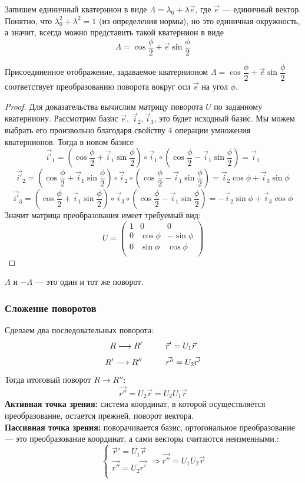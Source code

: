 Запишем единичный кватернион в виде $\Lambda = \lambda_0 + \lambda\vec{e}$, где $\vec{e}$ --- единичный вектор. Понятно, что $\lambda_0^2 + \lambda^2 = 1$ (из определения нормы), но это единичная окружность, а значит, всегда можно представить такой кватернион в виде
\[
\Lambda = \cos{\dfrac{\phi}{2}} + \vec{e}\sin{\dfrac{\phi}{2}}
\]
\begin{theorem}
    Присоединенное отображение, задаваемое кватернионом $\Lambda = \cos{\dfrac{\phi}{2}} + \vec{e}\sin{\dfrac{\phi}{2}}$ соответствует преобразованию поворота вокруг оси $\vec{e}$ на угол $\phi$.
\end{theorem}
\begin{proof}
    Для доказательства вычислим матрицу поворота $U$ по заданному кватерниону. Рассмотрим базис $\vec{e},~\vec{i}_2, \vec{i}_3$, это будет исходный базис. Мы можем выбрать его произвольно благодаря свойству 4 операции умножения кватернионов. Тогда в новом базисе
    \[
    \vec{i'}_1 = (\cos{\dfrac{\phi}{2}} + \vec{i}_1\sin{\dfrac{\phi}{2}}) \circ \vec{i}_1 \circ(\cos{\dfrac{\phi}{2}} - \vec{i}_1\sin{\dfrac{\phi}{2}}) = \vec{i}_1
    \]
    \[
    \vec{i'}_2 = (\cos{\dfrac{\phi}{2}} + \vec{i}_1\sin{\dfrac{\phi}{2}}) \circ \vec{i}_2 \circ(\cos{\dfrac{\phi}{2}} - \vec{i}_1\sin{\dfrac{\phi}{2}}) = \vec{i}_2\cos{\phi} + \vec{i}_3\sin{\phi}
    \]
    \[
    \vec{i'}_3 = (\cos{\dfrac{\phi}{2}} + \vec{i}_1\sin{\dfrac{\phi}{2}}) \circ \vec{i}_3 \circ(\cos{\dfrac{\phi}{2}} - \vec{i}_1\sin{\dfrac{\phi}{2}}) = -\vec{i}_2\sin{\phi} + \vec{i}_3\cos{\phi}
    \]
    Значит матрица преобразования имеет требуемый вид:
    \[
    U = \begin{pmatrix}
        1 & 0 & 0\\
        0 & \cos{\phi} & -\sin{\phi}\\
        0 & \sin{\phi} & \cos{\phi}\\
    \end{pmatrix}
    \]
\end{proof}
$\Lambda$ и $-\Lambda$ --- это один и тот же поворот.\\

\subsubsection{Сложение поворотов}
Сделаем два последовательных поворота:
\[
R \longrightarrow R' \hspace*{1cm} \vec{r}' = U_1\vec{r}
\]
\[
R' \longrightarrow R'' \hspace*{1cm} \vec{r''} = U_2\vec{r'}
\]
Тогда итоговый поворот $R \longrightarrow R''$:
\[
\vec{r''} = U_2\vec{r} = U_2U_1\vec{r}
\]
\textbf{Активная точка зрения:} система координат, в которой осуществляется преобразование, остается прежней, поворот вектора.\\
\textbf{Пассивная точка зрения:} поворачивается базис, ортогональное преобразование --- это преобразование координат, а сами векторы считаются неизменными.:
\[
\begin{cases}
    \vec{r}' = U_1\vec{r}\\
    \vec{r''} = U_2\vec{r'}\\
\end{cases} \Longrightarrow \vec{r''} = U_1U_2\vec{r}
\]

